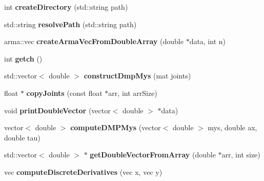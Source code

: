 \begin{DoxyCompactItemize}
\item 
\hypertarget{namespacekukadu_a90844d1af728408298335074234cb6bf}{int {\bfseries create\-Directory} (std\-::string path)}\label{namespacekukadu_a90844d1af728408298335074234cb6bf}

\item 
\hypertarget{namespacekukadu_a7b1f2056450bc85b74ecc4538afeb205}{std\-::string {\bfseries resolve\-Path} (std\-::string path)}\label{namespacekukadu_a7b1f2056450bc85b74ecc4538afeb205}

\item 
\hypertarget{namespacekukadu_acfe94f7c9dedf7e326afcede6c0dc470}{arma\-::vec {\bfseries create\-Arma\-Vec\-From\-Double\-Array} (double $\ast$data, int n)}\label{namespacekukadu_acfe94f7c9dedf7e326afcede6c0dc470}

\item 
\hypertarget{namespacekukadu_a9e31ceb82001724baca14add7b29be90}{int {\bfseries getch} ()}\label{namespacekukadu_a9e31ceb82001724baca14add7b29be90}

\item 
\hypertarget{namespacekukadu_accae42b85a473fbf487d9ba2a323df6a}{std\-::vector$<$ double $>$ {\bfseries construct\-Dmp\-Mys} (mat joints)}\label{namespacekukadu_accae42b85a473fbf487d9ba2a323df6a}

\item 
\hypertarget{namespacekukadu_ab997169b5dbe7f4f32cf8b65cb5eff23}{float $\ast$ {\bfseries copy\-Joints} (const float $\ast$arr, int arr\-Size)}\label{namespacekukadu_ab997169b5dbe7f4f32cf8b65cb5eff23}

\item 
\hypertarget{namespacekukadu_aba879f8f78972a2d5f1dce992888564c}{void {\bfseries print\-Double\-Vector} (vector$<$ double $>$ $\ast$data)}\label{namespacekukadu_aba879f8f78972a2d5f1dce992888564c}

\item 
\hypertarget{namespacekukadu_a818b7bfadd10b3b0387bd99c650da1ac}{vector$<$ double $>$ {\bfseries compute\-D\-M\-P\-Mys} (vector$<$ double $>$ mys, double ax, double tau)}\label{namespacekukadu_a818b7bfadd10b3b0387bd99c650da1ac}

\item 
\hypertarget{namespacekukadu_a6a8f99e06ddd1859374dddbb68f468b8}{std\-::vector$<$ double $>$ $\ast$ {\bfseries get\-Double\-Vector\-From\-Array} (double $\ast$arr, int size)}\label{namespacekukadu_a6a8f99e06ddd1859374dddbb68f468b8}

\item 
\hypertarget{namespacekukadu_aa60d33e5c4264f143ed2d61d724e4da0}{vec {\bfseries compute\-Discrete\-Derivatives} (vec x, vec y)}\label{namespacekukadu_aa60d33e5c4264f143ed2d61d724e4da0}


\end{DoxyCompactItemize}
